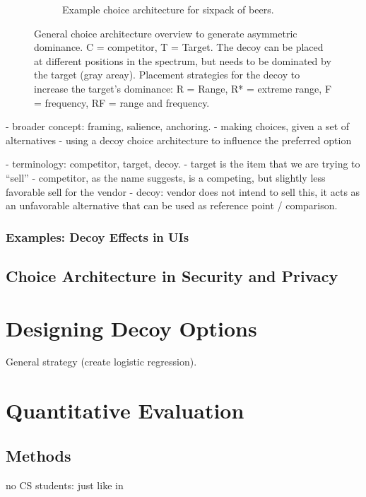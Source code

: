 \begin{figure}
\begin{subfigure}[t]{0.49\textwidth}
		\caption{Example choice architecture for sixpack of beers.}
	\end{subfigure}
	\caption{\label{fig:decoy:general-construction} 
		General choice architecture overview to generate asymmetric dominance. 
		C = competitor, T = Target. The decoy can be placed at different positions in the spectrum, but needs to be dominated by the target (gray areay). Placement strategies for the decoy to increase the target's dominance: R = Range, R* = extreme range, F = frequency, RF = range and frequency.
	} 
\end{figure}

- broader concept: framing, salience, anchoring. 
- making choices, given a set of alternatives
- using a decoy choice architecture to influence the preferred option 

- terminology: competitor, target, decoy.
- target is the item that we are trying to ``sell'' 
- competitor, as the name suggests, is a competing, but slightly less favorable sell for the vendor
- decoy: vendor does not intend to sell this, it acts as an unfavorable alternative that can be used as reference point / comparison.

\subsubsection{Examples: Decoy Effects in UIs}


\subsection{Choice Architecture in Security and Privacy}

\section{Designing Decoy Options}
General strategy (create logistic regression).

\section{Quantitative Evaluation}
\subsection{Methods}
no CS students: just like in \cite{Wash2016UnderstandingPasswordChoices}

